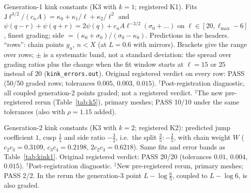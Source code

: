 \begin{table}[p]\centering\footnotesize\setlength\tabcolsep{2.5pt}

\caption{Generation-1 kink constants (K3 with $k=1$; registered K1). Fits $\mathsf J\ell^{3/2}/(c_nA)=\kappa_0+\kappa_1/\ell+\kappa_2/\ell^2$ and $\psi(q-r)+\psi(q+r)=2\psi(q)+c_nA\ell^{-3/2}(\sigma_0+\dots)$ on $\ell\in[20,\ell_{\max}-6]$, finest grading; side $=(\kappa_0+\sigma_0)/(\sigma_0-\kappa_0)$. Predictions in the headers. ``rows'': chain points $y_n$, $n<X$ (at $L=0.6$ with mirrors). Brackets give the range over rows; $\pm$ is a systematic band, not a standard deviation: the spread over grading ratios plus the change when the fit window starts at $\ell=15$ or $25$ instead of $20$ (\texttt{kink\_errors.out}). Original registered verdict on every row: PASS (50/50 graded rows; tolerances $0.005$, $0.003$, $0.015$). $^\dagger$Post-registration diagnostic, all coupled generation-2 points graded; not a registered verdict. $^\ddagger$The new pre-registered rerun (Table~\ref{tab:k5}), primary meshes; PASS 10/10 under the same tolerances (also with $\rho=1.15$ added).}\label{tab:kink1}
\end{table}

\begin{table}[p]\centering\footnotesize\setlength\tabcolsep{3pt}

\caption{Generation-2 kink constants (K3 with $k=2$; registered K2): predicted jump coefficient $1$, cusp $\frac15$ and side ratio $-\frac32$, i.e.\ the split $\frac35:-\frac25$, with chain weight $W$ ($c_2c_3=0.3109$, $c_3c_4=0.2198$, $2c_2c_3=0.6218$). Same fits and error bands as Table~\ref{tab:kink1}. Original registered verdict: PASS 20/20 (tolerances $0.01$, $0.004$, $0.015$). $^\dagger$Post-registration diagnostic. $^\ddagger$New pre-registered rerun, primary meshes; PASS 2/2. In the rerun the generation-3 point $L-\log\frac65$, coupled to $L-\log6$, is also graded.}\label{tab:kink2}
\end{table}


